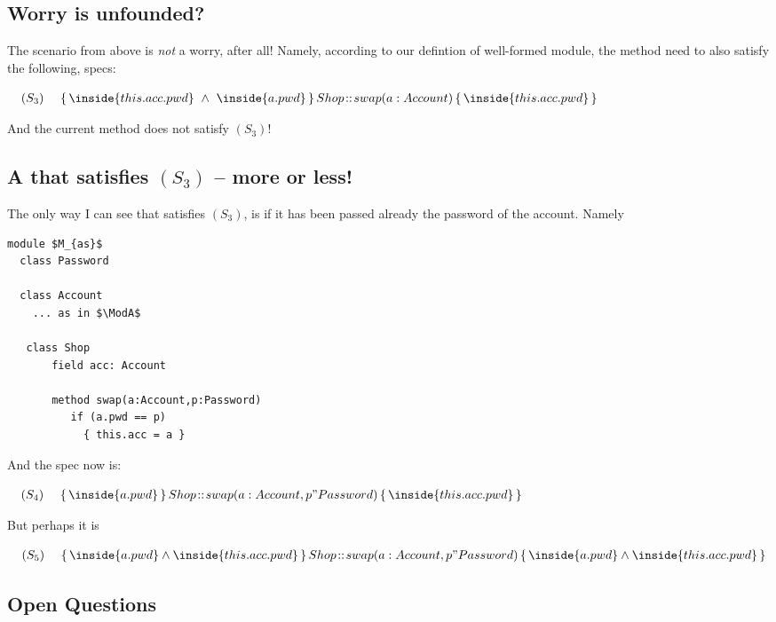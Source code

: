 \subsection{Worry is unfounded?}

The scenario from above is \emph{not} a worry, after all! 
Namely, according to our defintion of well-formed module, the method  need to also satisfy the following, specs:

$\strut \ \ \ (S_3)\ \ \ \ %
					 {\mprepostLong 
					 {\inside{this.acc.pwd} \ \wedge\ \inside {a.pwd} }
					 {Shop}
					 {swap}
					 {a:Account}
					{\inside {this.acc.pwd}}
					}$
					
					
 And the current method  does not satisfy $(S_3)$!
 
 \subsection{A  that satisfies $(S_3)$ -- more or less!}
 
The only way I can see that   satisfies $(S_3)$, is if it has been passed already the password of the account. Namely
 
 \begin{lstlisting}[mathescape=true, language=Chainmail, frame=lines]
module $M_{as}$        
  class Password
  
  class Account
    ... as in $\ModA$
    
   class Shop
       field acc: Account
       
       method swap(a:Account,p:Password)
          if (a.pwd == p)
          	{ this.acc = a }    
\end{lstlisting}

And the spec now is:

$\strut \ \ \ (S_4) \ \ \ \ %
					 {\mprepostLong 
					 {\inside{a.pwd}}
					 {Shop}
					 {swap}
					 {a:Account, p"Password}
					{\inside {this.acc.pwd}}
					}$
 
 But perhaps it is
 
 $\strut \ \ \ (S_5) \ \ \ \ %
					 {\mprepostLong 
					 {\inside{a.pwd} \wedge \inside{this.acc.pwd}}
					 {Shop}
					 {swap}
					 {a:Account, p"Password}
					 {\inside{a.pwd} \wedge \inside{this.acc.pwd}}
					}$

\subsection{Open Questions}

